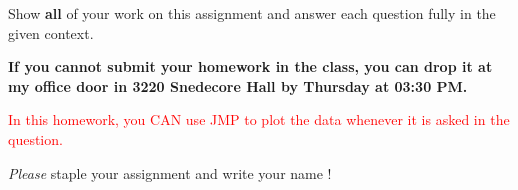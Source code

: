 \documentclass[11pt]{article}\usepackage[]{graphicx}\usepackage[]{color}
\begin{document}
\pagestyle{fancy} 

Show \textbf{all} of your work on this assignment and answer each question fully in the given context. 

\vspace{0.3cm}

\textbf{If you cannot submit your homework in the class, you can drop it at my office door in 3220 Snedecore Hall by Thursday at 03:30 PM.}

\vspace{0.3cm}

\textcolor{red}{In this homework, you CAN use JMP to plot the data whenever it is asked in the question.}
\vspace{0.3cm}

\emph{Please} staple your assignment and write your name !
\end{document}
